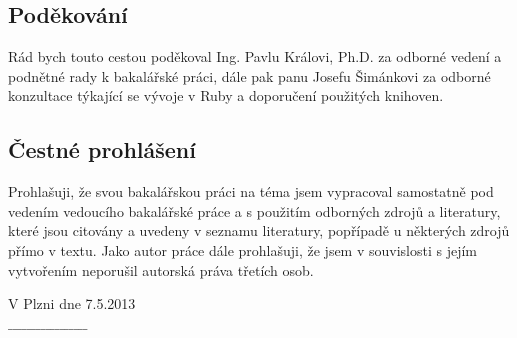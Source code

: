\thispagestyle{empty}
\subsection*{Poděkování}
Rád bych touto cestou poděkoval Ing. Pavlu Královi, Ph.D. za odborné vedení a podnětné rady k bakalářské práci, dále pak panu Josefu Šimánkovi za odborné konzultace týkající se vývoje v Ruby a doporučení použitých knihoven.
\\[9cm]
\subsection*{Čestné prohlášení}
Prohlašuji, že svou bakalářskou práci na téma  jsem vypracoval samostatně pod vedením vedoucího bakalářské práce a s použitím odborných zdrojů a literatury, které jsou citovány a uvedeny v seznamu literatury, popřípadě u některých zdrojů přímo v textu. Jako autor práce dále prohlašuji, že jsem v souvislosti s jejím vytvořením neporušil autorská práva třetích osob.
\\[1.5cm]
\begin{minipage}{0.4\textwidth}
\begin{flushleft}
V Plzni dne 7.5.2013
\end{flushleft}
\end{minipage}
\begin{minipage}{0.6\textwidth}
\begin{flushright} 
$\_\_\_\_\_\_\_\_\_\_\_\_\_\_\_\_\_$
\end{flushright}
\end{minipage}